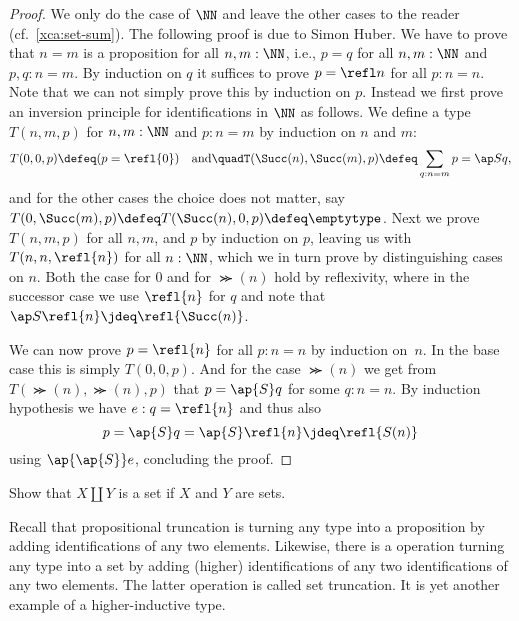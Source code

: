 \begin{proof}
  We only do the case of $\NN$ and leave the other cases to the reader
  (cf.\ \cref{xca:set-sum}). The following proof is due to Simon Huber.
  We have to prove that $n=m$ is a
  proposition for all $n,m:\NN$, i.e., $p = q$ for all $n,m : \NN$ and
  $p, q : n = m$.  By induction on $q$ it suffices to prove $p = \refl
  n$ for all $p : n = n$.  Note that we can not simply prove this by
  induction on $p$.  Instead we first prove an inversion principle for
  identifications in $\NN$ as follows.  We define a type $T(n,m,p)$
  for $n, m : \NN$ and $p : n = m$ by induction on $n$ and $m$:
  \[
    T(0,0,p) \defeq (p = \refl{0})%
    \quad \text{and} \quad%
    T(\Succ(n), \Succ(m), p) \defeq \sum_{q : n = m} p = \ap S q,%
  \]
  and for the other cases the choice does not matter, say $T(0, \Succ(m),
  p) \defeq T(\Succ(n), 0 ,p) \defeq \emptytype$.  Next we prove $T(n,m,p)$
  for all $n,m$, and $p$ by induction on $p$, leaving us with
  $T(n,n,\refl{n})$ for all $n : \NN$, which we in turn prove by
  distinguishing cases on $n$.  Both the case for $0$ and for $\Succ(n)$
  hold by reflexivity, where in the successor case we use $\refl{n}$
  for $q$ and note that $\ap S \refl{n} \jdeq \refl{\Succ(n)}$.

  We can now prove $p = \refl{n}$ for all $p : n = n$ by induction
  on~$n$.  In the base case this is simply $T(0,0,p)$.  And for the
  case $\Succ(n)$ we get from $T(\Succ(n),\Succ(n),p)$ that $p = \ap{S} q$ for
  some $q : n = n$.  By induction hypothesis we have $e : q =
  \refl{n}$ and thus also
  \[
    p = \ap{S} q = \ap{S} \refl{n} \jdeq \refl{S (n)}
  \]
  using $\ap{\ap{S}} e$, concluding the proof.
\end{proof}

\begin{xca}\label{xca:set-sum}
Show that $X\amalg Y$ is a set if $X$ and $Y$ are sets.
\end{xca}

Recall that propositional truncation is turning any type into
a proposition by adding identifications of any two elements.
Likewise, there is a operation turning any type into a set
by adding (higher) identifications of any two identifications
of any two elements. The latter operation is called set truncation.
It is yet another example of a higher-inductive type.

